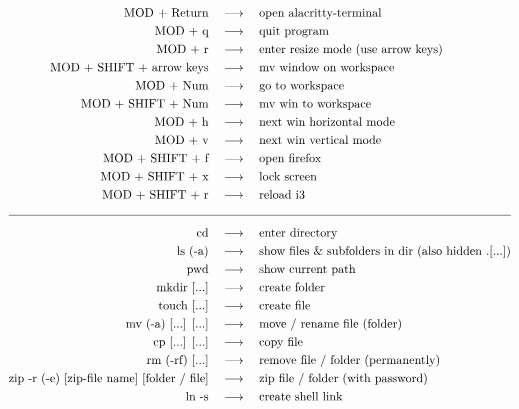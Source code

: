 


\begin{align*}
\text{MOD + Return} \quad &\longrightarrow \quad\text{open alacritty-terminal} \\
\text{MOD + q} \quad&\longrightarrow \quad\text{quit program} \\
\text{MOD + r} \quad&\longrightarrow \quad\text{enter resize mode (use arrow keys)} \\
\text{MOD + SHIFT + arrow keys} \quad&\longrightarrow \quad\text{mv window on workspace} \\
\text{MOD + Num} \quad&\longrightarrow \quad\text{go to workspace} \\
\text{MOD + SHIFT + Num} \quad&\longrightarrow \quad\text{mv win to workspace} \\
\text{MOD + h} \quad&\longrightarrow \quad\text{next win horizontal mode} \\
\text{MOD + v} \quad&\longrightarrow \quad\text{next win vertical mode} \\
\text{MOD + SHIFT + f} \quad&\longrightarrow \quad\text{open firefox} \\
\text{MOD + SHIFT + x} \quad&\longrightarrow \quad\text{lock screen} \\
\text{MOD + SHIFT + r} \quad&\longrightarrow \quad\text{reload i3} \\[1.0em]
\hline \\[-0.6em]
\text{cd}\quad&\longrightarrow\quad\text{enter directory} \\
\text{ls (-a)}\quad&\longrightarrow\quad\text{show files \& subfolders in dir (also hidden .[...])} \\
\text{pwd}\quad&\longrightarrow\quad\text{show current path} \\
\text{mkdir [...]}\quad&\longrightarrow\quad\text{create folder} \\
\text{touch [...]}\quad&\longrightarrow\quad\text{create file} \\
\text{mv (-a) [...] [...]}\quad&\longrightarrow\quad\text{move / rename file (folder)} \\
\text{cp [...] [...]}\quad&\longrightarrow\quad\text{copy file} \\
\text{rm (-rf) [...]}\quad&\longrightarrow\quad\text{remove file / folder (permanently)} \\
\text{zip -r (-e) [zip-file name] [folder / file]}\quad&\longrightarrow\quad\text{zip file / folder (with password)} \\
\text{ln -s}\quad&\longrightarrow\quad\text{create shell link} \\[1.0em]

\end{align*}
